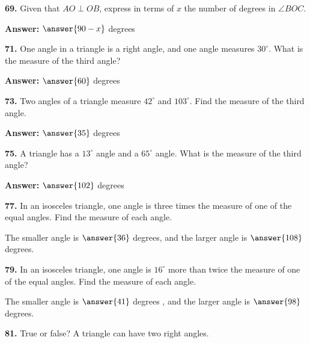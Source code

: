 \documentclass{ximera}
\begin{document}
\begin{problem}
\textbf{69.} Given that $AO \perp OB$, express in terms of $x$ the number of degrees in
  $\angle BOC$.

\textbf{Answer:} $\answer{90-x}$ degrees
\end{problem}

\begin{problem}
\textbf{71.} One angle in a triangle is a right angle, and one angle measures $30^\circ$. What
  is the measure of the third angle?

\textbf{Answer:} $\answer{60}$ degrees
\end{problem}

\begin{problem}
\textbf{73.} Two angles of a triangle measure $42^\circ$ and $103^\circ$. Find the measure of
  the third angle.

\textbf{Answer:} $\answer{35}$ degrees
\end{problem}

\begin{problem}
\textbf{75.} A triangle has a $13^\circ$ angle and a $65^\circ$ angle. What is the measure of
  the third angle?

\textbf{Answer:} $\answer{102}$ degrees
\end{problem}

\begin{problem}
\textbf{77.} In an isosceles triangle, one angle is three times the measure of one of the
  equal angles. Find the measure of each angle.

The smaller angle is $\answer{36}$ degrees, and the larger angle is $\answer{108}$ degrees.
\end{problem}

\begin{problem}
\textbf{79.} In an isosceles triangle, one angle is $16^\circ$ more than twice the measure of
  one of the equal angles. Find the measure of each angle.

The smaller angle is $\answer{41}$ degrees , and the larger angle is $\answer{98}$ degrees.
\end{problem}

\begin{problem}
\textbf{81.} True or false? A triangle can have two right angles.

\begin{multipleChoice}
\end{multipleChoice}
\end{problem}
\end{document}
